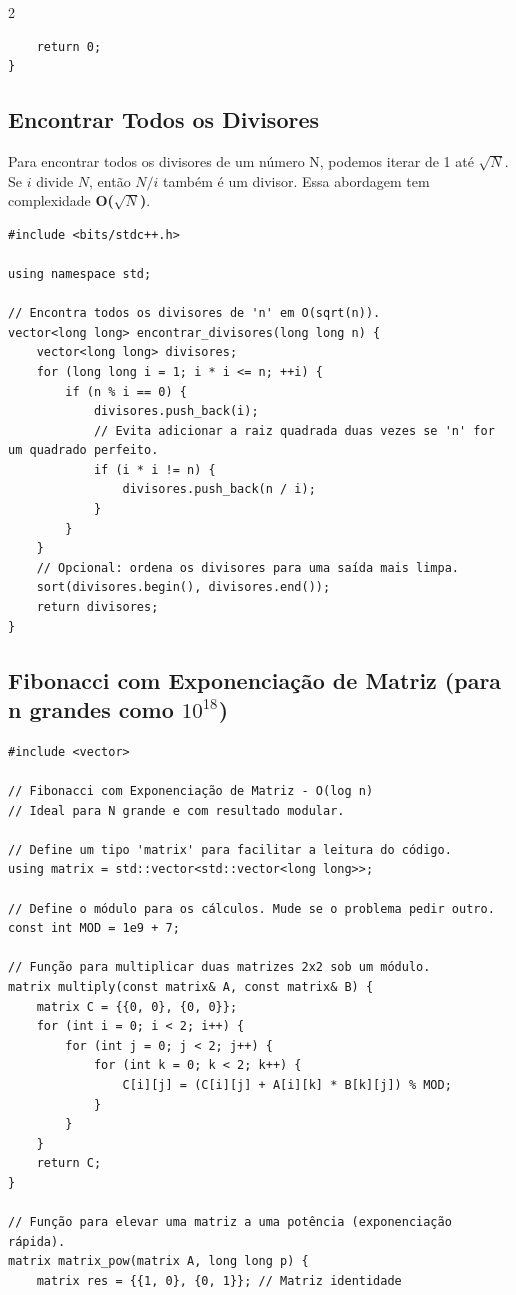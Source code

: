 \documentclass[11pt]{article}
\begin{document}
\begin{multicols}{2}
\begin{lstlisting}
    return 0;
}
\end{lstlisting}

\subsection{Encontrar Todos os Divisores}
Para encontrar todos os divisores de um número N, podemos iterar de 1 até $\sqrt{N}$. Se $i$ divide $N$, então $N/i$ também é um divisor. Essa abordagem tem complexidade \textbf{O($\sqrt{N}$)}.
\begin{lstlisting}
#include <bits/stdc++.h>

using namespace std;

// Encontra todos os divisores de 'n' em O(sqrt(n)).
vector<long long> encontrar_divisores(long long n) {
    vector<long long> divisores;
    for (long long i = 1; i * i <= n; ++i) {
        if (n % i == 0) {
            divisores.push_back(i);
            // Evita adicionar a raiz quadrada duas vezes se 'n' for um quadrado perfeito.
            if (i * i != n) {
                divisores.push_back(n / i);
            }
        }
    }
    // Opcional: ordena os divisores para uma saída mais limpa.
    sort(divisores.begin(), divisores.end());
    return divisores;
}
\end{lstlisting}    

\subsection{Fibonacci com Exponenciação de Matriz (para n grandes como $10^{18}$)}
\begin{lstlisting}
#include <vector>

// Fibonacci com Exponenciação de Matriz - O(log n)
// Ideal para N grande e com resultado modular.

// Define um tipo 'matrix' para facilitar a leitura do código.
using matrix = std::vector<std::vector<long long>>;

// Define o módulo para os cálculos. Mude se o problema pedir outro.
const int MOD = 1e9 + 7;

// Função para multiplicar duas matrizes 2x2 sob um módulo.
matrix multiply(const matrix& A, const matrix& B) {
    matrix C = {{0, 0}, {0, 0}};
    for (int i = 0; i < 2; i++) {
        for (int j = 0; j < 2; j++) {
            for (int k = 0; k < 2; k++) {
                C[i][j] = (C[i][j] + A[i][k] * B[k][j]) % MOD;
            }
        }
    }
    return C;
}

// Função para elevar uma matriz a uma potência (exponenciação rápida).
matrix matrix_pow(matrix A, long long p) {
    matrix res = {{1, 0}, {0, 1}}; // Matriz identidade


\end{lstlisting}
\end{multicols}
\end{document}
